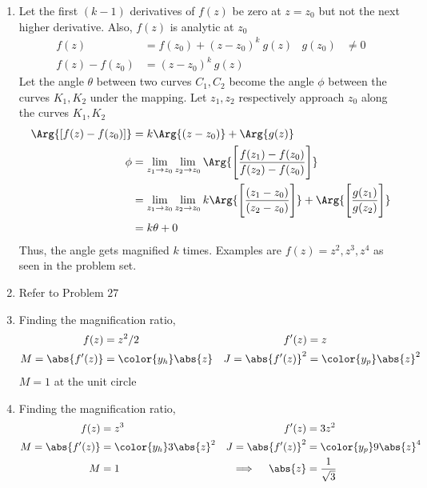 \begin{enumerate}
    \item Let the first $ (k-1) $ derivatives of $ f(z) $ be zero at $ z = z_0 $ but not
          the next higher derivative. Also, $ f(z) $ is analytic at $ z_0 $
          \begin{align}
              f(z)          & = f(z_0) + (z - z_0)^{k}\ g(z) &
              g(z_0)        & \neq 0                           \\
              f(z) - f(z_0) & = (z - z_0)^k\ g(z)            &
          \end{align}
          Let the angle $ \theta $ between two curves $ C_1, C_2 $ become the angle
          $ \phi $ between the curves $ K_1, K_2 $ under the mapping. Let $ z_1, z_2 $
          respectively approach $ z_0 $ along the curves $ K_1, K_2 $
          \begin{align}
              \Arg{[f(z) - f(z_0)]} & = k \Arg{(z - z_0)} + \Arg{g(z)}        \\
              \phi                  & = \lim_{z_1 \to z_0} \lim_{z_2 \to z_0}
              \Arg{\Bigg[\frac{f(z_1) - f(z_0)}{f(z_2) - f(z_0)}\Bigg]}       \\
                                    & = \lim_{z_1 \to z_0} \lim_{z_2 \to z_0}
              k \Arg{\Bigg[\frac{(z_1 - z_0)}{(z_2 - z_0)}
              \Bigg]} + \Arg{\Bigg[ \frac{g(z_1)}{g(z_2)} \Bigg]}             \\
                                    & = k\theta + 0
          \end{align}
          Thus, the angle gets magnified $ k $ times.
          Examples are $ f(z) = z^2, z^3, z^4 $ as seen in the problem set.

    \item Refer to Problem $ 27 $

    \item Finding the magnification ratio,
          \begin{align}
              f(z)              & = z^2/2                 &
              f'(z)             & = z                       \\
              M = \abs{f'(z)}   & = \color{y_h} \abs{z}   &
              J = \abs{f'(z)}^2 & = \color{y_p} \abs{z}^2
          \end{align}
          $ M=1 $ at the unit circle

    \item Finding the magnification ratio,
          \begin{align}
              f(z)                   & = z^3                    &
              f'(z)                  & = 3z^2                     \\
              M = \abs{f'(z)}        & = \color{y_h} 3\abs{z}^2 &
              J = \abs{f'(z)}^2      & = \color{y_p} 9\abs{z}^4   \\
              M                      & = 1                      &
              \implies \quad \abs{z} & = \frac{1}{\sqrt{3}}
          \end{align}


\end{enumerate}
